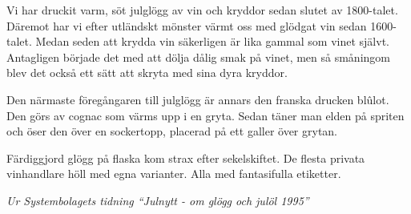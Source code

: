 \vspace{10pt}
\noindent\hspace*{10pt}Vi har druckit varm, söt julglögg av vin och kryddor sedan slutet av
1800-talet. Däremot har vi efter utländskt mönster värmt oss med
glödgat vin sedan 1600-talet. Medan seden att krydda vin säkerligen är
lika gammal som vinet självt. Antagligen började det med att dölja
dålig smak på vinet, men så småningom blev det också ett sätt att
skryta med sina dyra kryddor.\par
\noindent\hspace*{10pt}Den närmaste föregångaren till julglögg är annars den franska drucken blûlot. Den görs av cognac som värms upp i en gryta. Sedan täner man elden på spriten och öser den över en sockertopp, placerad på ett galler över grytan.\par
\noindent\hspace*{10pt}Färdiggjord glögg på flaska kom strax efter sekelskiftet. De flesta privata vinhandlare höll med egna varianter. Alla med fantasifulla etiketter.\par
\vspace{10pt}
{\footnotesize\textit{Ur Systembolagets tidning ``Julnytt - om glögg och julöl 1995''}}
